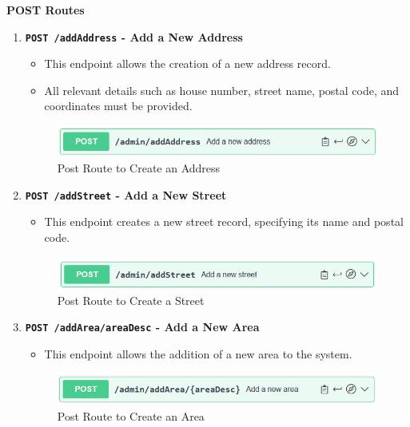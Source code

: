     \textbf{POST Routes}
    \begin{enumerate}
        \item \textbf{\texttt{POST /addAddress} - Add a New Address}
        \begin{itemize}
            \item This endpoint allows the creation of a new address record.
            \item All relevant details such as house number, street name, postal code, and coordinates must be provided.
        \end{itemize} 
        \begin{figure} [H]
            \centering
            \includegraphics [width=1\textwidth] {images/andreas/praxis/addAddress.png}
            \caption{Post Route to Create an Address}
        \end{figure}

        \item \textbf{\texttt{POST /addStreet} - Add a New Street}
        \begin{itemize}
            \item This endpoint creates a new street record, specifying its name and postal code.
        \end{itemize} 
        \begin{figure} [H]
            \centering
            \includegraphics [width=1\textwidth] {images/andreas/praxis/addStreet.png}
            \caption{Post Route to Create a Street}
        \end{figure}

        \item \textbf{\texttt{POST /addArea/{areaDesc}} - Add a New Area}
        \begin{itemize}
            \item This endpoint allows the addition of a new area to the system.
        \end{itemize} 
        \begin{figure} [H]
            \centering
            \includegraphics [width=1\textwidth] {images/andreas/praxis/addArea.png}
            \caption{Post Route to Create an Area}
        \end{figure}


\end{enumerate}
